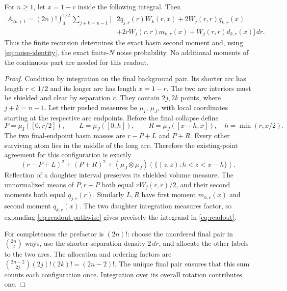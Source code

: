 \documentclass[11pt,letterpaper]{article}
\begin{document}
\begin{theorem}\label{thm:readout}
For $n\ge1$, let $x=1-r$ inside the following integral. Then
\begin{align}
 A_{2n+1}=(2n)!\int_0^{1/2}\sum_{j+k=n-1}\big[&
 2q_{j,r}(r)W_k(r,x)+2W_j(r,r)q_{k,r}(x)\nonumber\\
 &+2rW_j(r,r)m_{k,r}(x)+W_j(r,r)d_{k,r}(x)
 \big]\,dr.\label{eq:readout}
\end{align}
Thus the finite recursion determines the exact basin second moment and,
using \eqref{eq:noise-identity}, the exact finite-$N$ noise probability.
No additional moments of the continuous part are needed for this readout.
\end{theorem}
\begin{proof}
Condition by integration on the final background pair. Its shorter arc
has length $r<1/2$ and its longer arc has length $x=1-r$. The two arc
interiors must be shielded and clear by separation $r$. They contain
$2j,2k$ points, where $j+k=n-1$. Let their pushed measures be $\mu_I$,
$\mu_J$, with local coordinates starting at the respective arc endpoints.
Before the final collapse define
\[
 P=\mu_I([0,r/2]),\qquad L=\mu_J([0,h]),\qquad
 R=\mu_J([x-h,x]),\quad h=\min(r,x/2).
\]
The two final-endpoint basin masses are $r-P+L$ and $P+R$.
Every other surviving atom lies in the middle of the long arc. Therefore
the existing-point agreement for this configuration is exactly
\begin{equation}\label{eq:readout-pathwise}
 (r-P+L)^2+(P+R)^2+
 (\mu_J\otimes\mu_J)(\{(z,z):h<z<x-h\}).
\end{equation}
Reflection of a daughter interval preserves its shielded volume measure.
The unnormalized means of $P,r-P$ both equal $rW_j(r,r)/2$, and their
second moments both equal $q_{j,r}(r)$. Similarly $L,R$ have first moment
$m_{k,r}(x)$ and second moment $q_{k,r}(x)$. The two daughter integration
measures factor, so expanding \eqref{eq:readout-pathwise} gives precisely
the integrand in \eqref{eq:readout}.

For completeness the prefactor is $(2n)!$: choose the unordered final
pair in $\binom{2n}{2}$ ways, use the shorter-separation density $2\,dr$,
and allocate the other labels to the two arcs. The allocation and ordering
factors are
$\binom{2n-2}{2j}(2j)!(2k)!=(2n-2)!$. The unique final pair ensures
that this sum counts each configuration once. Integration over its
overall rotation contributes one.
\end{proof}
\end{document}
